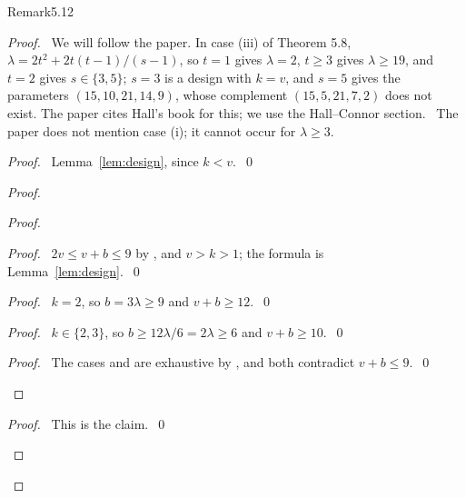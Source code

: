\begin{cgss}{Remark}{5.12}\label{rem:5.12}
\end{cgss}
\begin{proof}
 \pfsketch\ We will follow the paper. In case (iii) of Theorem 5.8,
 $\lambda=2t^2+2t(t-1)/(s-1)$, so $t=1$ gives $\lambda=2$, $t\ge3$ gives $\lambda\ge19$, and
 $t=2$ gives $s\in\{3,5\}$; $s=3$ is a design with $k=v$, and $s=5$ gives the parameters
 $(15,10,21,14,9)$, whose complement $(15,5,21,7,2)$ does not exist. The paper cites Hall's book
 for this; we use the Hall--Connor section. \new\ The paper does not mention case (i); it cannot
 occur for $\lambda\ge3$.
 \begin{proof}\pf\ Lemma~\ref{lem:design}, since $k<v$.~\qed\end{proof}
 \begin{proof}
  \begin{proof}
   \begin{proof}\pf\ $2v\le v+b\le9$ by , and $v>k>1$; the formula is
    Lemma~\ref{lem:design}.~\qed\end{proof}
   \begin{proof}\pf\ $k=2$, so $b=3\lambda\ge9$ and $v+b\ge12$.~\qed\end{proof}
   \begin{proof}\pf\ $k\in\{2,3\}$, so $b\ge12\lambda/6=2\lambda\ge6$ and
    $v+b\ge10$.~\qed\end{proof}
   \qedstep
   \begin{proof}\pf\ The cases  and  are exhaustive by
    , and both contradict $v+b\le9$.~\qed\end{proof}
  \end{proof}
  \begin{proof}\pf\ This is the claim.~\qed\end{proof}

\end{proof}
\end{proof}

